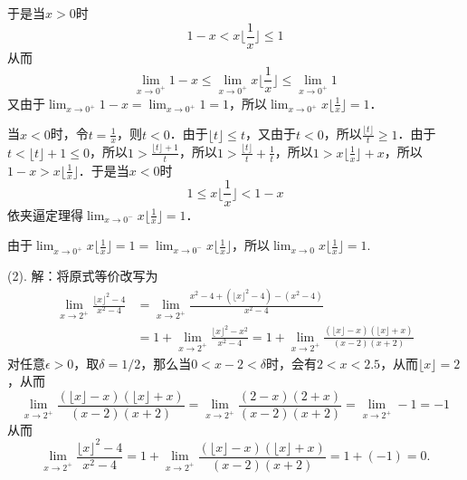 \noindent 于是当$x > 0$时
\begin{equation}
    1-x < x \bigg\lfloor \frac{1}{x} \bigg\rfloor \leq 1
\end{equation}
从而
\begin{equation}
    \lim_{x \to 0^+} 1 - x \leq \lim_{x \to 0^+} x \bigg\lfloor \frac{1}{x} \bigg\rfloor \leq \lim_{x \to 0^+} 1
\end{equation}
又由于$\displaystyle\lim_{x \to 0^+} 1-x = \displaystyle\lim_{x \to 0^+} 1 = 1$，所以$\displaystyle\lim_{x \to 0^+} x \bigg\lfloor \displaystyle\frac{1}{x} \bigg\rfloor = 1$．

\noindent 当$x < 0$时，令$t = \displaystyle\frac{1}{x}$，则$t < 0$．由于$\lfloor t \rfloor \leq t$，又由于$t<0$，所以$\displaystyle\frac{\lfloor t \rfloor}{t} \geq 1$．由于$t < \lfloor t \rfloor + 1 \leq 0$，所以$1 > \displaystyle\frac{\lfloor t \rfloor + 1}{t}$，所以$1 > \displaystyle\frac{\lfloor t \rfloor}{t} + \displaystyle\frac{1}{t}$，所以$1 > x \bigg\lfloor \displaystyle\frac{1}{x} \bigg\rfloor + x$，所以$1-x > x \bigg\lfloor \displaystyle\frac{1}{x} \bigg\rfloor$．于是当$x < 0$时
\begin{equation}
    1 \leq x \bigg\lfloor \frac{1}{x} \bigg\rfloor < 1-x
\end{equation}
依夹逼定理得$\displaystyle\lim_{x \to 0^-} x \bigg\lfloor \displaystyle\frac{1}{x} \bigg\rfloor = 1$．

\noindent 由于$\displaystyle\lim_{x \to 0^+} x \bigg\lfloor \displaystyle\frac{1}{x} \bigg\rfloor = 1 = \displaystyle\lim_{x \to 0^-} x \bigg\lfloor \displaystyle\frac{1}{x} \bigg\rfloor$，所以$\displaystyle\lim_{x \to 0} x \bigg\lfloor \displaystyle\frac{1}{x} \bigg\rfloor = 1$.

\noindent (2). 解：将原式等价改写为
\begin{align}
    \lim_{x \to 2^+} \frac{\lfloor x \rfloor^2 - 4}{x^2-4} &= \lim_{x \to 2^+} \frac{x^2-4 + (\lfloor x \rfloor^2 - 4) - (x^2 - 4)}{x^2 - 4} \\
    &= 1 + \lim_{x \to 2^+} \frac{\lfloor x \rfloor^2 - x^2}{x^2 - 4} = 1 + \lim_{x \to 2^+} \frac{(\lfloor x \rfloor - x)(\lfloor x \rfloor + x)}{(x-2)(x+2)}
\end{align}
对任意$\epsilon > 0$，取$\delta = 1/2$，那么当$0 < x - 2 < \delta$时，会有$2 < x < 2.5$，从而$\lfloor x \rfloor = 2$，从而
\begin{equation}
    \lim_{x \to 2^+} \frac{(\lfloor x \rfloor - x)(\lfloor x \rfloor + x)}{(x-2)(x+2)} = \lim_{x \to 2^+} \frac{(2-x)(2+x)}{(x-2)(x+2)} = \lim_{x \to 2^+} -1 = -1
\end{equation}
从而
\begin{equation}
    \lim_{x \to 2^+} \frac{\lfloor x \rfloor^2 - 4}{x^2-4} = 1 + \lim_{x \to 2^+} \frac{(\lfloor x \rfloor - x)(\lfloor x \rfloor + x)}{(x-2)(x+2)} = 1 + (-1) = 0.
\end{equation}

